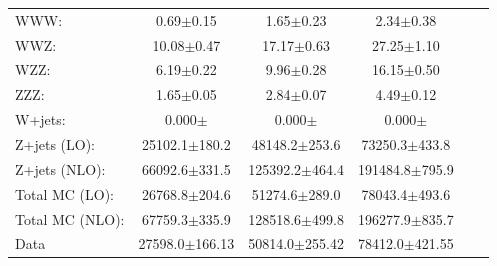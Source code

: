 \begin{table}[htbp]
\begin{tabular}{lccccc}
WWW: & 0.69$\pm$0.15 & 1.65$\pm$0.23 & 2.34$\pm$0.38    \\
WWZ: & 10.08$\pm$0.47 & 17.17$\pm$0.63 & 27.25$\pm$1.10    \\
WZZ: & 6.19$\pm$0.22 & 9.96$\pm$0.28 & 16.15$\pm$0.50    \\
ZZZ: & 1.65$\pm$0.05 & 2.84$\pm$0.07 & 4.49$\pm$0.12    \\
W+jets: & 0.000$\pm$ & 0.000$\pm$ & 0.000$\pm$    \\
\hline
Z+jets (LO): & 25102.1$\pm$180.2 & 48148.2$\pm$253.6 & 73250.3$\pm$433.8    \\
Z+jets (NLO): & 66092.6$\pm$331.5 & 125392.2$\pm$464.4 & 191484.8$\pm$795.9    \\
\hline
Total MC (LO): & 26768.8$\pm$204.6 & 51274.6$\pm$289.0 & 78043.4$\pm$493.6   \\
Total MC (NLO): & 67759.3$\pm$335.9 & 128518.6$\pm$499.8 & 196277.9$\pm$835.7    \\
\hline
Data & 27598.0$\pm$166.13 & 50814.0$\pm$255.42 & 78412.0$\pm$421.55    \\
\hline
\end{tabular}
\end{table}

